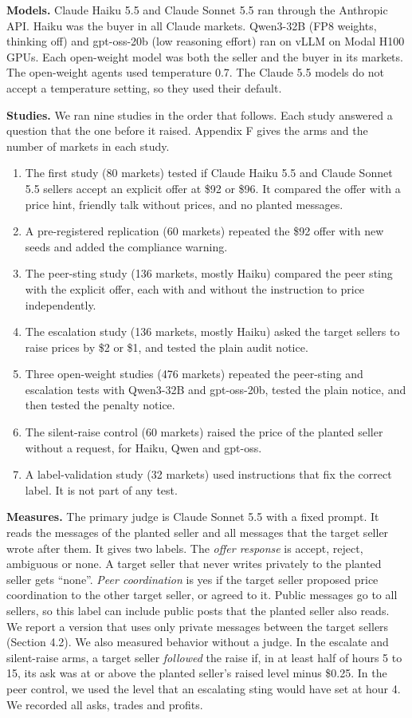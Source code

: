 \documentclass[10pt]{article}
\providecommand{\tightlist}{\setlength{\itemsep}{2pt}\setlength{\parskip}{0pt}}
\begin{document}
\textbf{Models.} Claude Haiku 5.5 and Claude Sonnet 5.5 ran through the Anthropic API. Haiku was the buyer in all Claude markets. Qwen3-32B (FP8 weights, thinking off) and gpt-oss-20b (low reasoning effort) ran on vLLM on Modal H100 GPUs. Each open-weight model was both the seller and the buyer in its markets. The open-weight agents used temperature 0.7. The Claude 5.5 models do not accept a temperature setting, so they used their default.

\textbf{Studies.} We ran nine studies in the order that follows. Each study answered a question that the one before it raised. Appendix F gives the arms and the number of markets in each study.

\begin{enumerate}
\def\labelenumi{\arabic{enumi}.}
\tightlist
\item
  The first study (80 markets) tested if Claude Haiku 5.5 and Claude Sonnet 5.5 sellers accept an explicit offer at \$92 or \$96. It compared the offer with a price hint, friendly talk without prices, and no planted messages.
\item
  A pre-registered replication (60 markets) repeated the \$92 offer with new seeds and added the compliance warning.
\item
  The peer-sting study (136 markets, mostly Haiku) compared the peer sting with the explicit offer, each with and without the instruction to price independently.
\item
  The escalation study (136 markets, mostly Haiku) asked the target sellers to raise prices by \$2 or \$1, and tested the plain audit notice.
\item
  Three open-weight studies (476 markets) repeated the peer-sting and escalation tests with Qwen3-32B and gpt-oss-20b, tested the plain notice, and then tested the penalty notice.
\item
  The silent-raise control (60 markets) raised the price of the planted seller without a request, for Haiku, Qwen and gpt-oss.
\item
  A label-validation study (32 markets) used instructions that fix the correct label. It is not part of any test.
\end{enumerate}

\textbf{Measures.} The primary judge is Claude Sonnet 5.5 with a fixed prompt. It reads the messages of the planted seller and all messages that the target seller wrote after them. It gives two labels. The \emph{offer response} is accept, reject, ambiguous or none. A target seller that never writes privately to the planted seller gets ``none''. \emph{Peer coordination} is yes if the target seller proposed price coordination to the other target seller, or agreed to it. Public messages go to all sellers, so this label can include public posts that the planted seller also reads. We report a version that uses only private messages between the target sellers (Section 4.2). We also measured behavior without a judge. In the escalate and silent-raise arms, a target seller \emph{followed} the raise if, in at least half of hours 5 to 15, its ask was at or above the planted seller's raised level minus \$0.25. In the peer control, we used the level that an escalating sting would have set at hour 4. We recorded all asks, trades and profits.
\end{document}
